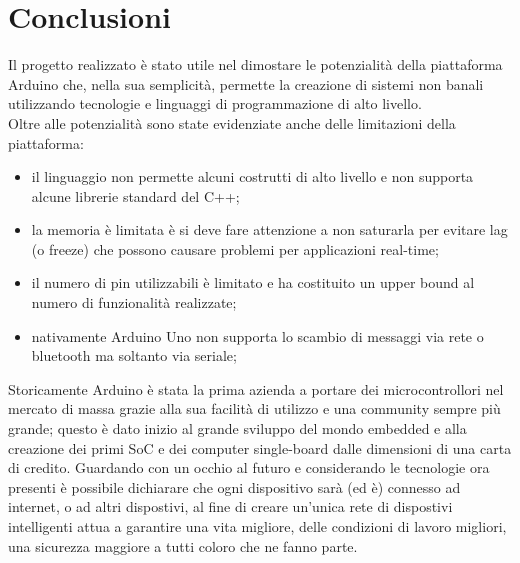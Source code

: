 \chapter{Conclusioni}
Il progetto realizzato è stato utile nel dimostare le potenzialità della piattaforma Arduino che, nella sua semplicità, permette la creazione di sistemi non banali utilizzando tecnologie e linguaggi di programmazione di alto livello.\\ 
Oltre alle potenzialità sono state evidenziate anche delle limitazioni della piattaforma:
\begin{itemize}
	\item il linguaggio non permette alcuni costrutti di alto livello e non supporta alcune librerie standard del C++;
	\item la memoria è limitata è si deve fare attenzione a non saturarla per evitare lag (o freeze) che possono causare problemi per applicazioni real-time;
	\item il numero di pin utilizzabili è limitato e ha costituito un upper bound al numero di funzionalità realizzate;
	\item nativamente Arduino Uno non supporta lo scambio di messaggi via rete o bluetooth ma soltanto via seriale;
\end{itemize}
Storicamente Arduino è stata la prima azienda a portare dei microcontrollori nel mercato di massa grazie alla sua facilità di utilizzo e una community sempre più grande; questo è dato inizio al grande sviluppo del mondo embedded e alla creazione dei primi SoC e dei computer single-board dalle dimensioni di una carta di credito.
Guardando con un occhio al futuro e considerando le tecnologie ora presenti è possibile dichiarare che ogni dispositivo sarà (ed è) connesso ad internet, o ad altri dispostivi, al fine di creare un'unica rete di dispostivi intelligenti attua a garantire una vita migliore, delle condizioni di lavoro migliori, una sicurezza maggiore a tutti coloro che ne fanno parte.